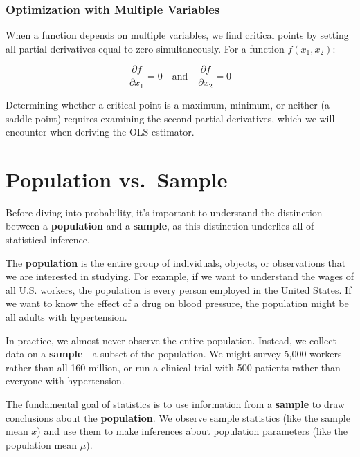 \documentclass[
  letterpaper,
  DIV=11,
  numbers=noendperiod]{scrreprt}
\begin{document}
\subsubsection{Optimization with Multiple
Variables}\label{optimization-with-multiple-variables}

When a function depends on multiple variables, we find critical points
by setting all partial derivatives equal to zero simultaneously. For a
function \(f(x_1, x_2)\):

\[
\frac{\partial f}{\partial x_1} = 0 \quad \text{and} \quad \frac{\partial f}{\partial x_2} = 0
\]

Determining whether a critical point is a maximum, minimum, or neither
(a saddle point) requires examining the second partial derivatives,
which we will encounter when deriving the OLS estimator.

\section{Population vs.~Sample}\label{population-vs.-sample}

Before diving into probability, it's important to understand the
distinction between a \textbf{population} and a \textbf{sample}, as this
distinction underlies all of statistical inference.

The \textbf{population} is the entire group of individuals, objects, or
observations that we are interested in studying. For example, if we want
to understand the wages of all U.S. workers, the population is every
person employed in the United States. If we want to know the effect of a
drug on blood pressure, the population might be all adults with
hypertension.

In practice, we almost never observe the entire population. Instead, we
collect data on a \textbf{sample}---a subset of the population. We might
survey 5,000 workers rather than all 160 million, or run a clinical
trial with 500 patients rather than everyone with hypertension.

\begin{tcolorbox}[enhanced jigsaw, arc=.35mm, bottomrule=.15mm, bottomtitle=1mm, breakable, colback=white, colbacktitle=quarto-callout-important-color!10!white, colframe=quarto-callout-important-color-frame, coltitle=black, left=2mm, leftrule=.75mm, opacityback=0, opacitybacktitle=0.6, rightrule=.15mm, title=\textcolor{quarto-callout-important-color}{\faExclamation}\hspace{0.5em}{The Goal of Statistical Inference}, titlerule=0mm, toprule=.15mm, toptitle=1mm]

The fundamental goal of statistics is to use information from a
\textbf{sample} to draw conclusions about the \textbf{population}. We
observe sample statistics (like the sample mean \(\bar{x}\)) and use
them to make inferences about population parameters (like the population
mean \(\mu\)).

\end{tcolorbox}
\end{document}
